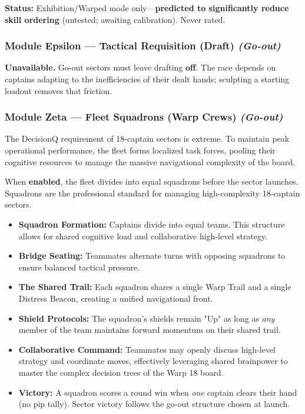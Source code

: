 \documentclass[11pt]{article}
\providecommand{\tightlist}{%
  \setlength{\itemsep}{0pt}\setlength{\parskip}{0pt}}
\begin{document}
\textbf{Status:} Exhibition/Warped mode only---\textbf{predicted to
significantly reduce skill ordering} (untested; awaiting calibration).
Never rated.

\subsubsection{Module Epsilon --- Tactical Requisition (Draft)
\emph{(Go-out)}}\label{module-epsilon--draft-go-out}

\textbf{Unavailable.} Go-out sectors must leave drafting \textbf{off}.
The race depends on captains adapting to the inefficiencies of their
dealt hands; sculpting a starting loadout removes that friction.

\subsubsection{Module Zeta --- Fleet Squadrons (Warp Crews)
\emph{(Go-out)}}\label{module-zeta--fleet-squadrons-go-out}

The DecisionQ requirement of 18-captain sectors is extreme. To maintain
peak operational performance, the fleet forms localized task forces,
pooling their cognitive resources to manage the massive navigational
complexity of the board.

When \textbf{enabled}, the fleet divides into equal squadrons before the
sector launches. Squadrons are the professional standard for managing
high-complexity 18-captain sectors.

\begin{itemize}
\tightlist
\item
  \textbf{Squadron Formation:} Captains divide into equal teams. This
  structure allows for shared cognitive load and collaborative
  high-level strategy.
\item
  \textbf{Bridge Seating:} Teammates alternate turns with opposing
  squadrons to ensure balanced tactical pressure.
\item
  \textbf{The Shared Trail:} Each squadron shares a single Warp Trail
  and a single Distress Beacon, creating a unified navigational front.
\item
  \textbf{Shield Protocols:} The squadron's shields remain "Up" as long
  as \emph{any} member of the team maintains forward momentum on their
  shared trail.
\item
  \textbf{Collaborative Command:} Teammates may openly discuss
  high-level strategy and coordinate moves, effectively leveraging
  shared brainpower to master the complex decision trees of the Warp 18
  board.
\item
  \textbf{Victory:} A squadron scores a round win when \emph{one} captain
  clears their hand (no pip tally). Sector victory follows the go-out
  structure chosen at launch.
\end{itemize}
\end{document}
